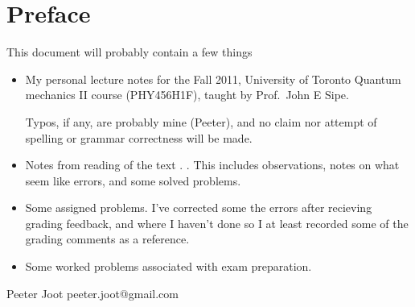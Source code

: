 \chapter*{Preface}\normalsize

This document will probably contain a few things

\begin{itemize}
\item My personal lecture notes for the Fall 2011, University of Toronto Quantum mechanics II course (PHY456H1F), taught by Prof.\ John E Sipe.

Typos, if any, are probably mine (Peeter), and no claim nor attempt of spelling or grammar correctness will be made.

\item Notes from reading of the text \citep{desai2009quantum}.  .  This includes observations, notes on what seem like errors, and some solved problems.

\item Some assigned problems.  I've corrected some the errors after recieving grading feedback, and where I haven't done so I at least recorded some of the grading comments as a reference.

\item Some worked problems associated with exam preparation.

\end{itemize}

Peeter Joot  \quad peeter.joot@gmail.com 
